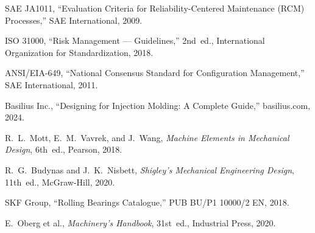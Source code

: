\documentclass[11pt,letterpaper,twoside,openany]{book}
\begin{document}
\begin{enumerate}[label={[\arabic*]},leftmargin=2em]
\item SAE JA1011, ``Evaluation Criteria for Reliability-Centered Maintenance (RCM) Processes,'' SAE International, 2009.
\item ISO 31000, ``Risk Management --- Guidelines,'' 2nd~ed., International Organization for Standardization, 2018.
\item ANSI/EIA-649, ``National Consensus Standard for Configuration Management,'' SAE International, 2011.
\item Basilius Inc., ``Designing for Injection Molding: A Complete Guide,'' basilius.com, 2024.
\item R.~L.~Mott, E.~M.~Vavrek, and J.~Wang, \emph{Machine Elements in Mechanical Design}, 6th~ed., Pearson, 2018.
\item R.~G.~Budynas and J.~K.~Nisbett, \emph{Shigley's Mechanical Engineering Design}, 11th~ed., McGraw-Hill, 2020.
\item SKF Group, ``Rolling Bearings Catalogue,'' PUB BU/P1 10000/2 EN, 2018.
\item E.~Oberg et al., \emph{Machinery's Handbook}, 31st~ed., Industrial Press, 2020.
\end{enumerate}
\end{document}
